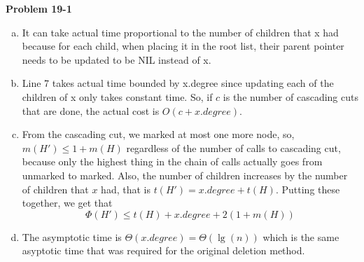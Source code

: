 \documentclass{article}
\begin{document}
\noindent\textbf{Problem 19-1}\\

\begin{enumerate}[a.]
\item It can take actual time proportional to the number of children that x had because for each child, when placing it in the root list, their parent pointer needs to be updated to be NIL instead of x.

\item Line 7 takes actual time bounded by x.degree since updating each of the children of x only takes constant time. So, if $c$ is the number of cascading cuts that are done, the actual cost is $O(c+x.degree)$.

\item From the cascading cut, we marked at most one more node, so, $m(H') \le 1 + m(H)$ regardless of the number of calls to cascading cut, because only the highest thing in the chain of calls actually goes from unmarked to marked. Also, the number of children increases by the number of children that $x$ had, that is $t(H') = x.degree + t(H)$. Putting these together, we get that
\[
\Phi(H') \le t(H)+ x.degree + 2(1+m(H))
\]

\item The asymptotic time is $\Theta(x.degree) = \Theta(\lg(n))$ which is the same asyptotic time that was required for the original deletion method.

\end{enumerate}
\end{document}
